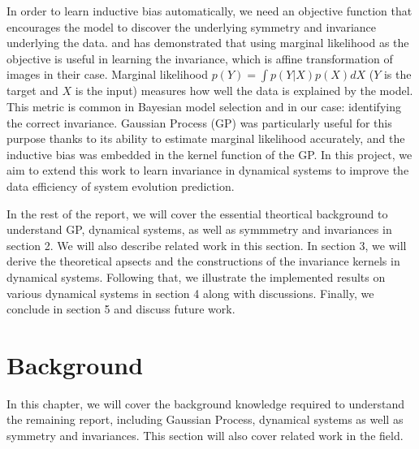 \documentclass{statsmsc}
\begin{document}
In order to learn inductive bias automatically, we need an objective function that encourages the model to discover the underlying symmetry and invariance underlying the data. 
\cite{Mark2017} and \cite{Tycho2021} has demonstrated that using marginal likelihood as the objective is useful in learning the invariance, which is affine transformation of images in their case.
Marginal likelihood $p(Y)=\int p(Y|X)p(X)dX$ ($Y$ is the target and $X$ is the input) measures how well the data is explained by the model.
This metric is common in Bayesian model selection and in our case: identifying the correct invariance. 
Gaussian Process (GP) was particularly useful for this purpose thanks to its ability to estimate marginal likelihood accurately, and the inductive bias was embedded in the kernel function of the GP.
In this project, we aim to extend this work to learn invariance in dynamical systems to improve the data efficiency of system evolution prediction.

In the rest of the report, we will cover the essential theortical background to understand GP, dynamical systems, as well as symmmetry and invariances in section 2. We will also describe related work in this section.
In section 3, we will derive the theoretical apsects and the constructions of the invariance kernels in dynamical systems.
Following that, we illustrate the implemented results on various dynamical systems in section 4 along with discussions.
Finally, we conclude in section 5 and discuss future work.

 
\chapter{Background}
In this chapter, we will cover the background knowledge required to understand the remaining report, including Gaussian Process, dynamical systems as well as symmetry and invariances. 
This section will also cover related work in the field.
\end{document}
